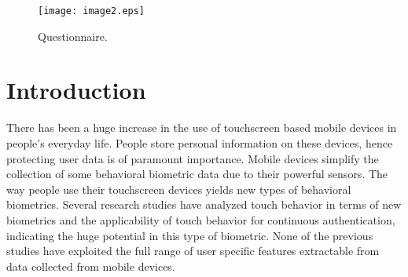 \documentclass[referee]{raa}            %
\begin{document}
\begin{figure}
   \centering
   \texttt{[image: image2.eps]}
   \caption{Questionnaire. }
   \label{Fig2}
   \end{figure}  

   \maketitle

%
%
\section{Introduction}           %
\label{sect:intro}
\par
There has been a huge increase in the use of touchscreen based mobile devices in people’s everyday life. People store personal information on these devices, hence protecting user data is of paramount importance. Mobile devices simplify the collection of some behavioral biometric data due to their powerful sensors. The way people use their touchscreen devices yields new types of behavioral biometrics. Several research studies have analyzed touch behavior in terms of new biometrics and the applicability of touch behavior for continuous authentication, indicating the huge potential in this type of biometric. None of the previous studies have exploited the full range of user specific features extractable from data collected from mobile devices.
\end{document}
